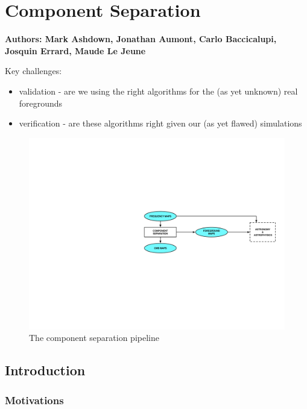 
\section{Component Separation}

\textbf{ Authors: Mark Ashdown, Jonathan Aumont, Carlo Baccicalupi, Josquin Errard, Maude Le Jeune}

Key challenges:
\begin{itemize}
\item validation - are we using the right algorithms for the (as yet unknown) real foregrounds
\item verification - are these algorithms right given our (as yet flawed) simulations
\end{itemize}

\begin{figure}[htbp]
\centering
\includegraphics[width=1\textwidth]{Analysis/cs}
\caption{The component separation pipeline}
\label{default}
\end{figure}


\subsection{Introduction}


\subsubsection{Motivations}

